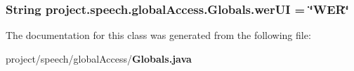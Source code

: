 \subsubsection[{wer\+U\+I}]{\setlength{\rightskip}{0pt plus 5cm}String project.\+speech.\+global\+Access.\+Globals.\+wer\+U\+I = \char`\"{}W\+E\+R\char`\"{}\hspace{0.3cm}{\ttfamily [static]}}\label{classproject_1_1speech_1_1global_access_1_1_globals_a0e941681d9115a17dc29c5e62d548360}


The documentation for this class was generated from the following file\+:\begin{DoxyCompactItemize}
\item 
project/speech/global\+Access/{\bf Globals.\+java}\end{DoxyCompactItemize}
